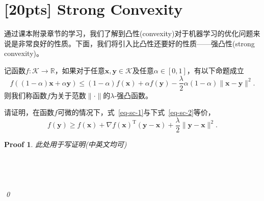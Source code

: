 \documentclass[a4paper,UTF8]{article}
\numberwithin{equation}{section}
\newtheorem*{myProof}{Proof}
\begin{document}
\section{[20pts] Strong Convexity}
通过课本附录章节的学习，我们了解到凸性(convexity)对于机器学习的优化问题来说是非常良好的性质。下面，我们将引入比凸性还要好的性质——强凸性(strong convexity)。
\begin{def-box}[强凸性]
记函数$f: \mathcal{K} \rightarrow \mathbb{R}$，如果对于任意$\mathbf{x}, \mathbf{y} \in \mathcal{K}$及任意$\alpha\in[0,1]$，有以下命题成立
\begin{equation}
  \label{eq-sc-1}
  f((1-\alpha)\mathbf{x} + \alpha\mathbf{y})\leq (1-\alpha)f(\mathbf{x}) + \alpha f(\mathbf{y}) - \frac{\lambda}{2}\alpha(1-\alpha)\lVert \mathbf{x} - \mathbf{y}\rVert^2.
\end{equation}
则我们称函数$f$为关于范数$\lVert \cdot \rVert$的$\lambda$-强凸函数。
\end{def-box}

请证明，在函数$f$可微的情况下，式~\eqref{eq-sc-1}与下式~\eqref{eq-sc-2}等价，
\begin{equation}
  \label{eq-sc-2}
  f(\mathbf{y}) \geq f(\mathbf{x}) + \nabla f(\mathbf{x})^\mathrm{T}(\mathbf{y}-\mathbf{x}) + \frac{\lambda}{2}\lVert \mathbf{y} - \mathbf{x}\rVert^2.
\end{equation}
\begin{myProof}
此处用于写证明(中英文均可)
~\\
~\\
~\\
~\\
~\\
\qed
\end{myProof}


\newpage
\end{document}
